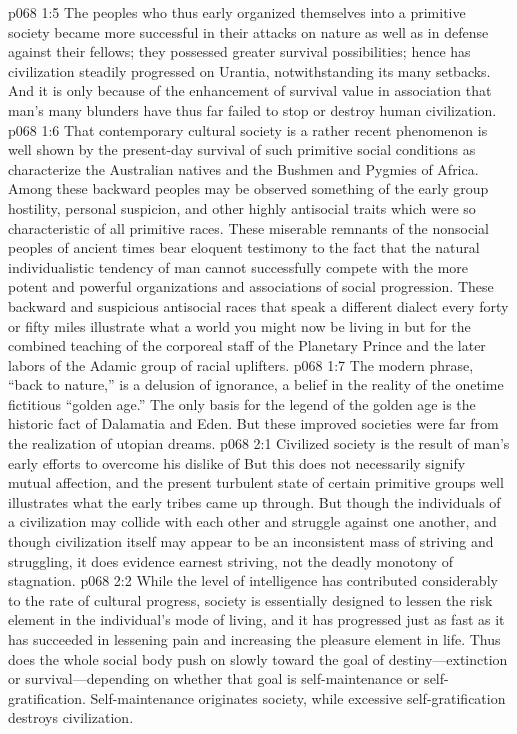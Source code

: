 \vs p068 1:5 The peoples who thus early organized themselves into a primitive society became more successful in their attacks on nature as well as in defense against their fellows; they possessed greater survival possibilities; hence has civilization steadily progressed on Urantia, notwithstanding its many setbacks. And it is only because of the enhancement of survival value in association that man’s many blunders have thus far failed to stop or destroy human civilization.
\pc \vs p068 1:6 That contemporary cultural society is a rather recent phenomenon is well shown by the present\hyp{}day survival of such primitive social conditions as characterize the Australian natives and the Bushmen and Pygmies of Africa. Among these backward peoples may be observed something of the early group hostility, personal suspicion, and other highly antisocial traits which were so characteristic of all primitive races. These miserable remnants of the nonsocial peoples of ancient times bear eloquent testimony to the fact that the natural individualistic tendency of man cannot successfully compete with the more potent and powerful organizations and associations of social progression. These backward and suspicious antisocial races that speak a different dialect every forty or fifty miles illustrate what a world you might now be living in but for the combined teaching of the corporeal staff of the Planetary Prince and the later labors of the Adamic group of racial uplifters.
\vs p068 1:7 The modern phrase, “back to nature,” is a delusion of ignorance, a belief in the reality of the onetime fictitious “golden age.” The only basis for the legend of the golden age is the historic fact of Dalamatia and Eden. But these improved societies were far from the realization of utopian dreams.\plusone
{}
\vs p068 2:1 Civilized society is the result of man’s early efforts to overcome his dislike of  But this does not necessarily signify mutual affection, and the present turbulent state of certain primitive groups well illustrates what the early tribes came up through. But though the individuals of a civilization may collide with each other and struggle against one another, and though civilization itself may appear to be an inconsistent mass of striving and struggling, it does evidence earnest striving, not the deadly monotony of stagnation.
\vs p068 2:2 While the level of intelligence has contributed considerably to the rate of cultural progress, society is essentially designed to lessen the risk element in the individual’s mode of living, and it has progressed just as fast as it has succeeded in lessening pain and increasing the pleasure element in life. Thus does the whole social body push on slowly toward the goal of destiny---extinction or survival---depending on whether that goal is self\hyp{}maintenance or self\hyp{}gratification. Self\hyp{}maintenance originates society, while excessive self\hyp{}gratification destroys civilization.
